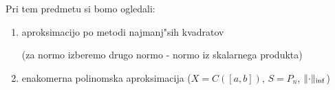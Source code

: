 \documentclass[a4paper,12pt]{article}
\DeclarePairedDelimiter\norm{\lVert}{\rVert}
\theoremstyle{definition}
\theoremstyle{remark}
\begin{document}
Pri tem predmetu si bomo ogledali:
\begin{enumerate}
    \item aproksimacijo po metodi najmanj"sih kvadratov
    
    (za normo izberemo drugo normo - normo iz skalarnega produkta)
    \item enakomerna polinomska aproksimacija ($X = C([a, b])$, $S = P_n$, $\norm{\cdot}_{\inf}$)
\end{enumerate}

%
%
%
%
\end{document}
